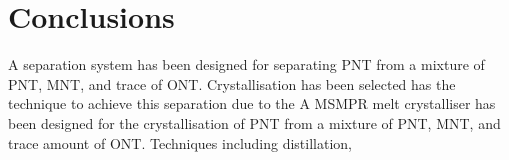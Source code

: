 \section{Conclusions}\label{separation conclusions}

A separation system has been designed for separating PNT from a mixture of PNT, MNT, and trace of ONT. Crystallisation has been selected has the technique to achieve this separation due to the  A MSMPR melt crystalliser has been designed for the crystallisation of PNT from a mixture of PNT, MNT, and trace amount of ONT. Techniques including distillation, 